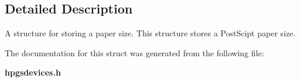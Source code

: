 \subsection{Detailed Description}
A structure for storing a paper size. This structure stores a PostScipt paper size. 

The documentation for this struct was generated from the following file:\begin{DoxyCompactItemize}
\item 
{\bf hpgsdevices.h}\end{DoxyCompactItemize}
